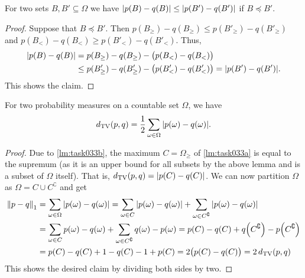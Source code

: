 \begin{solution}
            \begin{lemma}  \label{lm:task033b}
                For two sets \(B, B' \subseteq \Omega\) we have \( \abs{p(B) - q(B)} \leq \abs{p(B') - q(B')} \) if \(B \preceq B'\).
            \end{lemma}
            \begin{proof}
                Suppose that \(B \preceq B'\). Then \(p(B_\geq) - q(B_\geq) \leq p(B'_\geq) - q(B'_\geq)\) and \(p(B_<) - q(B_<) \geq p(B'_<) - q(B'_<)\). Thus,
                \begin{align}
                    \abs{p(B) - q(B)}
                        &= p(B_\geq) - q(B_\geq) - \bigl( p(B_<) - q(B_<) \bigr) \\
                        &\leq p(B'_\geq) - q(B'_\geq) - \bigl( p(B'_<) - q(B'_<) \bigr)
                         = \abs{p(B') - q(B')}.
                \end{align}
                This shows the claim.
            \end{proof}

            \begin{theorem}
                For two probability measures on a countable set \(\Omega\), we have
                \begin{equation}
                    d_\mathrm{TV}(p, q) = \frac{1}{2} \sum_{\omega \in \Omega} \abs{p(\omega) - q(\omega)}.
                \end{equation}
            \end{theorem}
            \begin{proof}
                Due to \cref{lm:task033b}, the maximum \(C = \Omega_\geq\) of \cref{lm:task033a} is equal to the supremum (as it is an upper bound for all subsets by the above lemma and is a subset of \(\Omega\) itself). That is, \(d_\mathrm{TV}(p, q) = \abs{p(C) - q(C)}\). We can now partition \(\Omega\) as \(\Omega = C \cup C^\complement\) and get
                \begin{align}
                    \norm{p - q}_1
                        &= \sum_{\omega \in \Omega} \abs{p(\omega) - q(\omega)}
                         = \sum_{\omega \in C} \abs{p(\omega) - q(\omega)}
                         + \sum_{\omega \in C^\complement} \abs{p(\omega) - q(\omega)} \\
                        &= \sum_{\omega \in C} p(\omega) - q(\omega)
                         + \sum_{\omega \in C^\complement} q(\omega) - p(\omega)
                         = p(C) - q(C) + q\Bigl( C^\complement \Bigr) - p\Bigl( C^\complement \Bigr) \\
                        &= p(C) - q(C) + 1 - q(C) - 1 + p(C)
                         = 2 \bigl( p(C) - q(C) \bigr)
                         = 2 \, d_\mathrm{TV}(p, q)
                \end{align}
                This shows the desired claim by dividing both sides by two.
            \end{proof}
        \end{solution}
